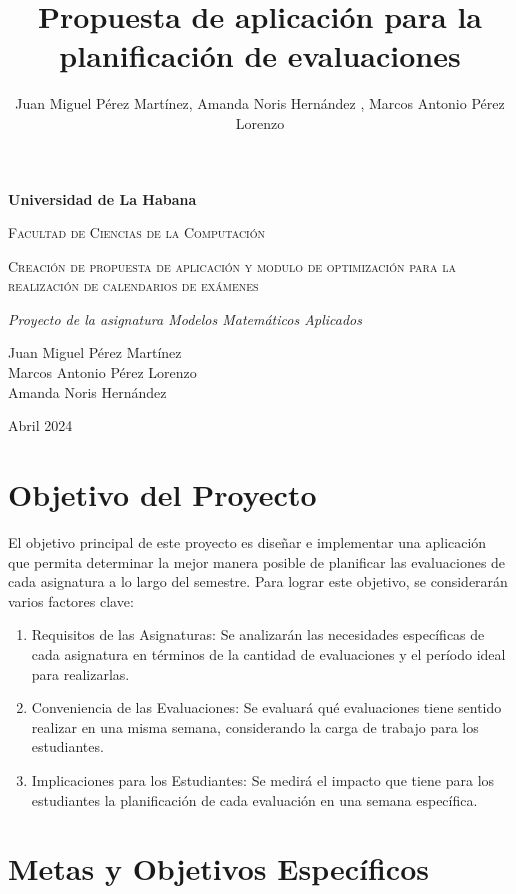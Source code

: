 \documentclass{article}
\title {Propuesta de aplicación para la planificación de evaluaciones}
\author{Juan Miguel Pérez Martínez, Amanda Noris Hernández , Marcos Antonio Pérez Lorenzo}
\begin{document}
\begin{titlepage}
\centering
{\bfseries\LARGE Universidad de La Habana \par}
\vspace{1cm}
{\scshape\Large Facultad de Ciencias de la Computación \par}
\vspace{3cm}
{\scshape\Huge Creaci\'on de propuesta de aplicaci\'on y modulo de optimizaci\'on para la realizaci\'on de calendarios de ex\'amenes  \par}
\vspace{3cm}
{\itshape\Large Proyecto de la asignatura Modelos Matem\'aticos Aplicados\par}
\vfill
{\Large  Juan Miguel P\'erez Martínez  \\
Marcos Antonio Pérez Lorenzo  \\
Amanda Noris Hernández\par}

\vfill
{\Large Abril 2024 \par}
\end{titlepage}
\section{Objetivo del Proyecto}

El objetivo principal de este proyecto es diseñar e implementar una aplicación que permita determinar la mejor manera posible de planificar las evaluaciones de cada asignatura a lo largo del semestre. Para lograr este objetivo, se considerarán varios factores clave:

\begin{enumerate}
\item Requisitos de las Asignaturas: Se analizarán las necesidades específicas de cada asignatura en términos de la cantidad de evaluaciones y el período ideal para realizarlas.
\item Conveniencia de las Evaluaciones: Se evaluará qué evaluaciones tiene sentido realizar en una misma semana, considerando la carga de trabajo para los estudiantes.
\item Implicaciones para los Estudiantes: Se medirá el impacto que tiene para los estudiantes la planificación de cada evaluación en una semana específica.
\end{enumerate}

\section{Metas y Objetivos Específicos}
\end{document}
